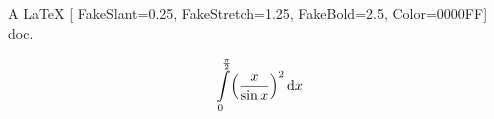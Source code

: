 \documentclass{article}
\begin{document}
A \LaTeX {
  \iftutex{}[
    FakeSlant=0.25, FakeStretch=1.25, FakeBold=2.5, Color=0000FF]\fi
  doc.
}

\newpage

\[ \int\limits_0^{\frac{\pi}{2}} \Bigl(\frac{x}{\sin x}\Bigr)^2\,\mathrm{d}x \]

\end{document}
